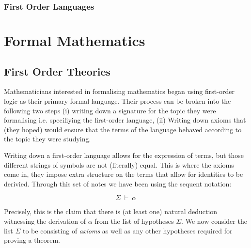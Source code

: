 \documentclass{book}
\begin{document}

        \subsection{First Order Languages}

\chapter{Formal Mathematics}

    \newpage
    \section{First Order Theories}

    Mathematicians interested in formalising mathematics began using first-order logic as their primary formal language. Their process can be broken into the following two steps (i) writing down a signature for the topic they were formalising i.e. specifiying the first-order language, (ii) Writing down axioms that (they hoped) would ensure that the terms of the language behaved according to the topic they were studying. 

    Writing down a first-order language allows for the expression of terms, but those different strings of symbols are not (literally) equal. This is where the axioms come in, they impose extra structure on the terms that allow for identities to be derivied. Through this set of notes we have been using the sequent notation: 

    $$\Sigma \ \vdash \ \alpha$$

    Precisely, this is the claim that there is (at least one) natural deduction witnessing the derivation of $\alpha$ from the list of hypotheses $\Sigma$. We now consider the list $\Sigma$ to be consisting of \emph{axioms} as well as any other hypotheses required for proving a theorem. 
\end{document}
